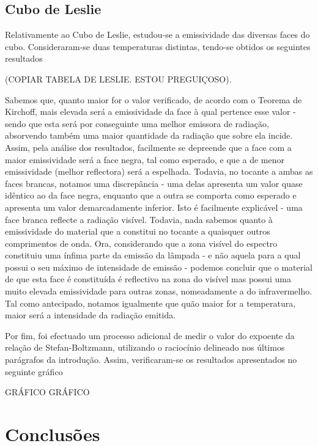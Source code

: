 \documentclass[9pt]{extarticle}
\begin{document}
\begin{multicols}{2}
\subsection{Cubo de Leslie}

\par Relativamente ao Cubo de Leslie, estudou-se a emissividade das diversas faces do cubo. Consideraram-se duas temperaturas distintas, tendo-se obtidos os seguintes resultados

(COPIAR TABELA DE LESLIE. ESTOU PREGUIÇOSO).

\par Sabemos que, quanto maior for o valor verificado, de acordo com o Teorema de Kirchoff, mais elevada será a emissividade da face à qual pertence esse valor - sendo que esta será por conseguinte uma melhor emissora de radiação, absorvendo também uma maior quantidade da radiação que sobre ela incide. Assim, pela análise dos resultados, facilmente se depreende que a face com a maior emissividade será a face negra, tal como esperado, e que a de menor emissividade (melhor reflectora) será a espelhada. Todavia, no tocante a ambas as faces brancas, notamos uma discrepância - uma delas apresenta um valor quase idêntico ao da face negra, enquanto que a outra se comporta como esperado e apresenta um valor demarcadamente inferior. Isto é facilmente explicável - uma face branca reflecte a radiação visível. Todavia, nada sabemos quanto à emissividade do material que a constitui no tocante a quaisquer outros comprimentos de onda. Ora, considerando que a zona visível do espectro constituiu uma ínfima parte da emissão da lâmpada - e não aquela para a qual possui o seu máximo de intensidade de emissão - podemos concluir que o material de que esta face é constituída é reflectivo na zona do visível mas possui uma muito elevada emissividade para outras zonas, nomeadamente a do infravermelho. Tal como antecipado, notamos igualmente que quão maior for a temperatura, maior será a intensidade da radiação emitida.

\par Por fim, foi efectuado um processo adicional de medir o valor do expoente da relação de Stefan-Boltzmann, utilizando o raciocínio delineado nos últimos parágrafos da introdução. Assim, verificaram-se os resultados apresentados no seguinte gráfico

GRÁFICO GRÁFICO

\section{Conclusões}


\end{multicols}
\end{document}

